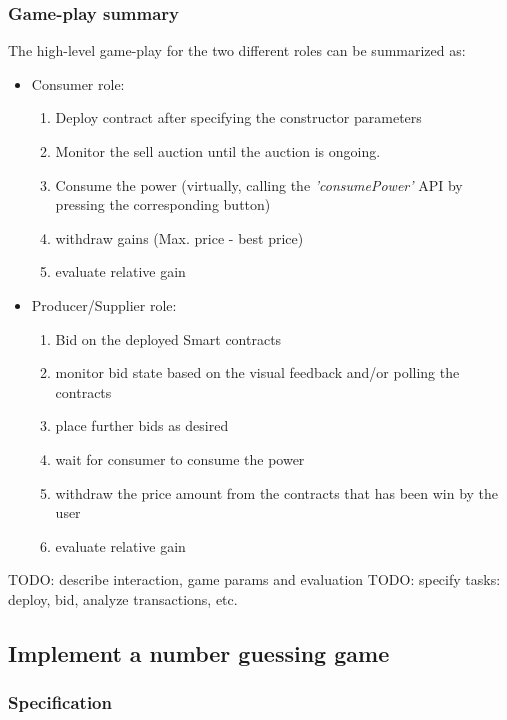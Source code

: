 \documentclass[a4paper]{article}
\begin{document}
\subsubsection{Game-play summary}

The high-level game-play for the two different roles can be summarized as:
\begin{itemize}
    \item Consumer role:
    \begin{enumerate}
        \item Deploy contract after specifying the constructor parameters
        \item Monitor the sell auction until the auction is ongoing.
        \item Consume the power (virtually, calling the \emph{'consumePower'} API by pressing the corresponding button)
        \item withdraw gains (Max. price - best price)
        \item evaluate relative gain
    \end{enumerate}
    \item Producer/Supplier role:
    \begin{enumerate}
        \item Bid on the deployed Smart contracts
        \item monitor bid state based on the visual feedback and/or polling the contracts
        \item place further bids as desired
        \item wait for consumer to consume the power
        \item withdraw the price amount from the contracts that has been win by the user
        \item evaluate relative gain
    \end{enumerate}
\end{itemize}

TODO: describe interaction, game params and evaluation
TODO: specify tasks: deploy, bid, analyze transactions, etc.

\subsection{Implement a number guessing game}

\subsubsection{Specification}
\end{document}
